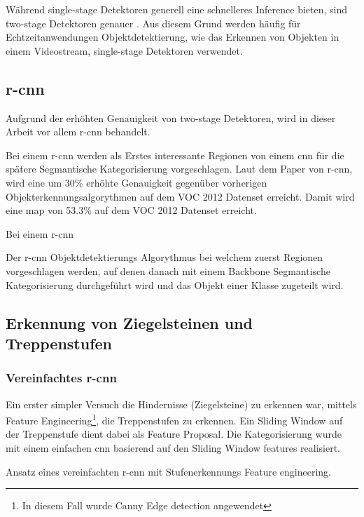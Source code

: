 Während single-stage Detektoren generell eine schnelleres Inference bieten, sind two-stage Detektoren genauer \cite{soviany2018optimizing}.
Aus diesem Grund werden häufig für Echtzeitanwendungen Objektdetektierung, wie das Erkennen von Objekten in einem Videostream, single-stage
Detektoren verwendet.

\subsection{\acrfull{r-cnn}}

Aufgrund der erhöhten Genauigkeit von two-stage Detektoren, wird in dieser Arbeit vor allem \acrshort{r-cnn} behandelt.

Bei einem \acrshort{r-cnn} \cite{girshick2014rich} werden als Erstes interessante Regionen von einem \acrshort{cnn} für die 
spätere Segmantische Kategorisierung vorgeschlagen. Laut dem Paper von \acrshort{r-cnn}, wird eine um 30\% erhöhte Genauigkeit 
gegenüber vorherigen Objekterkennungsalgorythmen auf dem VOC 2012 Datenset erreicht. Damit wird eine \acrfull{map} von 53.3\%
auf dem VOC 2012 Datenset erreicht.

Bei einem \acrshort{r-cnn} 

{
  Der \acrfull{r-cnn} \cite{girshick2014rich} Objektdetektierungs Algorythmus bei welchem zuerst Regionen 
  vorgeschlagen werden, auf denen danach mit einem Backbone Segmantische Kategorisierung durchgeführt wird und
  das Objekt einer Klasse zugeteilt wird.
}

\subsection{Erkennung von Ziegelsteinen und Treppenstufen}

\subsubsection{Vereinfachtes \acrshort{r-cnn}}

Ein erster simpler Versuch die Hindernisse (Ziegelsteine) zu erkennen war, mittels Feature Engineering\footnote{
In diesem Fall wurde Canny Edge detection \cite{canny-edge-detection} angewendet}, die Treppenstufen zu
erkennen. Ein Sliding Window auf der Treppenstufe dient dabei als Feature Proposal.
Die Kategorisierung wurde mit einem einfachen \acrshort{cnn} basierend auf den Sliding Window features 
realisiert.

{
Ansatz eines vereinfachten \acrshort{r-cnn} mit Stufenerkennungs Feature engineering.
}

